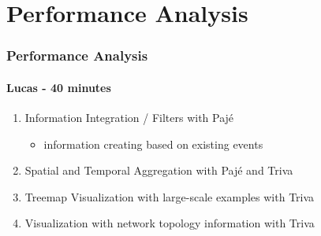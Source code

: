 \section{Performance Analysis}

\frame
{
  \frametitle{Performance Analysis}
  \framesubtitle{Lucas - 40 minutes}

  \begin{enumerate}
  \item Information Integration / Filters with Paj\'e
    \begin{itemize}
    \item information creating based on existing events
    \end{itemize}
  \item Spatial and Temporal Aggregation with Paj\'e and Triva
  \item Treemap Visualization with large-scale examples with Triva
  \item Visualization with network topology information with Triva
  \end{enumerate}
}
